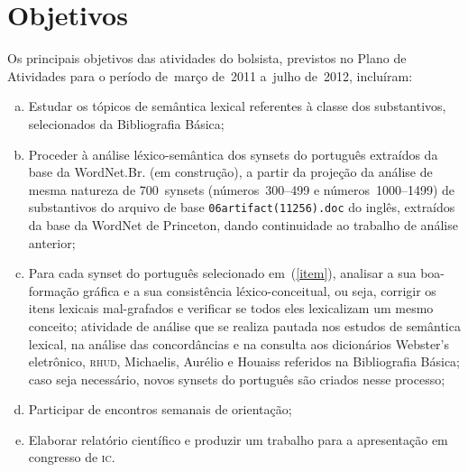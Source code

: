 \chapter{Objetivos}

Os principais objetivos das atividades do bolsista, previstos no Plano de
Atividades para o período de~março de~2011 a~julho de~2012, incluíram:

\begin{enumerate}[a.] \item Estudar os tópicos de semântica lexical referentes
      à classe dos substantivos, selecionados da Bibliografia Básica;

  \item\label{item} Proceder à análise léxico-semântica dos synsets do
    português extraídos da base da WordNet.Br. (em construção), a partir da
    projeção da análise de mesma natureza de 700~synsets (números~300--499 e
    números~1000--1499) de substantivos do arquivo de base
    \texttt{06artifact(11256).doc} do inglês, extraídos da base da WordNet de
    Princeton, dando continuidade ao trabalho de análise anterior;

  \item Para cada synset do português selecionado em~(\ref{item}), analisar a
    sua boa-formação gráfica e a sua consistência léxico-conceitual, ou seja,
    corrigir os itens lexicais mal-grafados e verificar se todos eles
    lexicalizam um mesmo conceito; atividade de análise que se realiza pautada
    nos estudos de semântica lexical, na análise das concordâncias e na
    consulta aos dicionários Webster's eletrônico, \textsc{rhud}, Michaelis,
    Aurélio e Houaiss referidos na Bibliografia Básica; caso seja necessário,
    novos synsets do português são criados nesse processo;

  \item Participar de encontros semanais de orientação;

  \item Elaborar relatório científico e produzir um trabalho para a
    apresentação em congresso de \textsc{ic}.
\end{enumerate}
